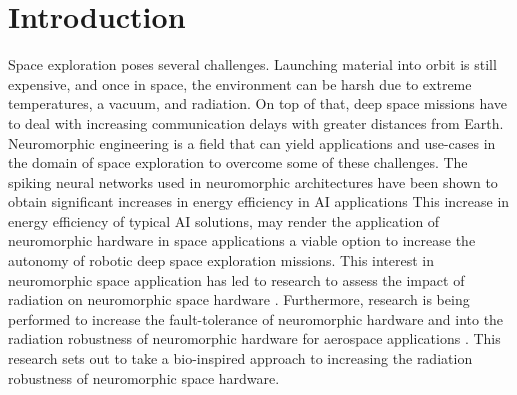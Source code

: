 \section{Introduction}\label{sec:introduction}
Space exploration poses several challenges. Launching material into orbit is still expensive, and once in space, the environment can be harsh due to extreme temperatures, a vacuum, and radiation. On top of that, deep space missions have to deal with increasing communication delays with greater distances from Earth. Neuromorphic engineering is a field that can yield applications and use-cases in the domain of space exploration to overcome some of these challenges. The spiking neural networks used in neuromorphic architectures have been shown to obtain significant increases in energy efficiency in AI applications \cite{todo}\cite{todo}%
This increase in energy efficiency of typical AI solutions, may render the application of neuromorphic hardware in space applications a viable option to increase the autonomy of robotic deep space exploration missions. 
This interest in neuromorphic space application has led to research to assess the impact of radiation on neuromorphic space hardware \cite{cantley_impact_2021,roffe_neutron-induced_2021}. Furthermore, research is being performed to increase the fault-tolerance of neuromorphic hardware \cite{tran_design_2011} and into the radiation robustness of neuromorphic hardware for aerospace applications \cite{vaz_cmos_2020}. This research sets out to take a bio-inspired approach to increasing the radiation robustness of neuromorphic space hardware.

